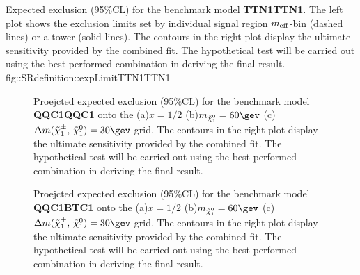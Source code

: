 {Expected exclusion (95$\%$CL) for the benchmark model \textbf{TTN1TTN1}. The left plot shows the exclusion limits set by individual signal region $m_{\mathrm{eff}}$-bin (dashed lines) or a tower (solid lines). The contours in the right plot display the ultimate sensitivity provided by the combined fit. The hypothetical test will be carried out using the best performed combination in deriving the final result. }
{fig::SRdefinition::expLimitTTN1TTN1}


\begin{figure}[h]
  \centering
    \caption{Proejcted expected exclusion (95$\%$CL) for the benchmark model \textbf{QQC1QQC1} onto the (a)$x=1/2$ (b)$\mLSP=60\gev$ (c) $\dmc=30\gev$ grid. The contours in the right plot display the ultimate sensitivity provided by the combined fit. The hypothetical test will be carried out using the best performed combination in deriving the final result. }
    \label{fig::SRdefinition::expLimitQQC1QQC1}
\end{figure}

\begin{figure}[h]
  \centering
    \caption{Proejcted expected exclusion (95$\%$CL) for the benchmark model \textbf{QQC1BTC1} onto the (a)$x=1/2$ (b)$\mLSP=60\gev$ (c) $\dmc=30\gev$ grid. The contours in the right plot display the ultimate sensitivity provided by the combined fit. The hypothetical test will be carried out using the best performed combination in deriving the final result. }
    \label{fig::SRdefinition::expLimitQQC1BTC1}
\end{figure}


